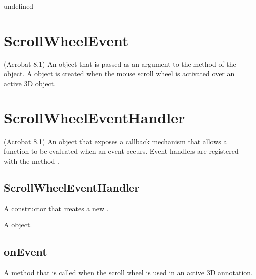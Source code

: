\documentclass[letterpaper,12pt,english,openany,oneside]{sphinxmanual}
\begin{document}
\label{\detokenize{JS_3D_API:section-114}}\label{\detokenize{JS_3D_API:returns-115}}

undefined


\section{ScrollWheelEvent}
\label{\detokenize{JS_3D_API:scrollwheelevent}}
(Acrobat 8.1) An object that is passed as an argument to the  method of the  object. A  object is created when the mouse scroll wheel is activated over an active 3D  object.

\label{\detokenize{JS_3D_API:properties-28}}


\section{ScrollWheelEventHandler}
\label{\detokenize{JS_3D_API:scrollwheeleventhandler}}
(Acrobat 8.1) An object that exposes a callback mechanism that allows a function to be evaluated when an event occurs. Event handlers are registered with the  method .


\subsection{ScrollWheelEventHandler}
\label{\detokenize{JS_3D_API:scrollwheeleventhandler-1}}\label{\detokenize{JS_3D_API:id32}}
A constructor that creates a new .

\label{\detokenize{JS_3D_API:syntax-115}}

\begin{sphinxVerbatim}[commandchars=\\\{\}]
 
\end{sphinxVerbatim}
\label{\detokenize{JS_3D_API:returns-116}}

A  object.


\subsection{onEvent}
\label{\detokenize{JS_3D_API:onevent-6}}\label{\detokenize{JS_3D_API:id33}}
A method that is called when the scroll wheel is used in an active 3D annotation.
\end{document}
